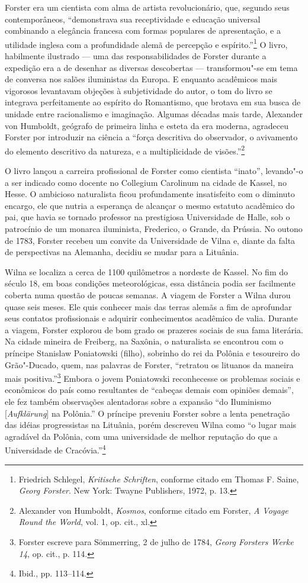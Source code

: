 Forster era um cientista com alma de artista revolucionário, que,
segundo seus contemporâneos, ``demonstrava sua receptividade e educação
universal combinando a elegância francesa com formas populares de
apresentação, e a utilidade inglesa com a profundidade alemã de
percepção e espírito.''\footnote{Friedrich Schlegel, \emph{Kritische
  Schriften}, conforme citado em Thomas F. Saine, \emph{Georg Forster}.
  New York: Twayne Publishers, 1972, p. 13.} O livro, habilmente
ilustrado --- uma das responsabilidades de Forster durante a expedição era
a de desenhar as diversas descobertas --- transformou"-se em tema de
conversa nos salões iluministas da Europa. E enquanto acadêmicos mais
vigorosos levantavam objeções à subjetividade do autor, o tom do livro
se integrava perfeitamente ao espírito do Romantismo, que brotava em sua
busca de unidade entre racionalismo e imaginação. Algumas décadas mais
tarde, Alexander von Humboldt, geógrafo de primeira linha e esteta da
era moderna, agradeceu Forster por introduzir na ciência a ``força
descritiva do observador, o avivamento do elemento descritivo da
natureza, e a multiplicidade de visões.''\footnote{Alexander von
  Humboldt, \emph{Kosmos}, conforme citado em Forster, \emph{A Voyage
  Round the World}, vol. 1, op. cit., xl.}

O livro lançou a carreira profissional de Forster como cientista
``inato'', levando"-o a ser indicado como docente no Collegium Carolinum
na cidade de Kassel, no Hesse. O ambicioso naturalista ficou
profundamente insatisfeito com o diminuto encargo, ele que nutria a
esperança de alcançar o mesmo estatuto acadêmico do pai, que havia se
tornado professor na prestigiosa Universidade de Halle, sob o patrocínio
de um monarca iluminista, Frederico, o Grande, da Prússia. No outono de
1783, Forster recebeu um convite da Universidade de Vilna e, diante da
falta de perspectivas na Alemanha, decidiu se mudar para a Lituânia.

Wilna se localiza a cerca de 1100 quilômetros a nordeste de Kassel. No
fim do século 18, em boas condições meteorológicas, essa distância podia
ser facilmente coberta numa questão de poucas semanas. A viagem de
Forster a Wilna durou quase seis meses. Ele quis conhecer mais das
terras alemãs a fim de aprofundar seus contatos profissionais e adquirir
conhecimentos acadêmico de valia. Durante a viagem, Forster explorou de
bom grado os prazeres sociais de sua fama literária. Na cidade mineira
de Freiberg, na Saxônia, o naturalista se encontrou com o príncipe
Stanislaw Poniatowski (filho), sobrinho do rei da Polônia e tesoureiro
do Grão"-Ducado, quem, nas palavras de Forster, ``retratou os lituanos da
maneira mais positiva.''\footnote{Forster escreve para Sömmerring, 2 de
  julho de 1784, \emph{Georg Forsters Werke 14}, op. cit., p. 114.}
Embora o jovem Poniatowski reconhecesse os problemas sociais e
econômicos do país como resultantes de ``cabeças demais com opiniões
demais'', ele fez também observações alentadoras sobre a expansão ``do
Iluminismo {[}\emph{Aufklärung}{]} na Polônia.'' O príncipe preveniu
Forster sobre a lenta penetração das idéias progressistas na Lituânia,
porém descreveu Wilna como ``o lugar mais agradável da Polônia, com uma
universidade de melhor reputação do que a Universidade de
Cracóvia.''\footnote{Ibid., pp. 113--114.}

